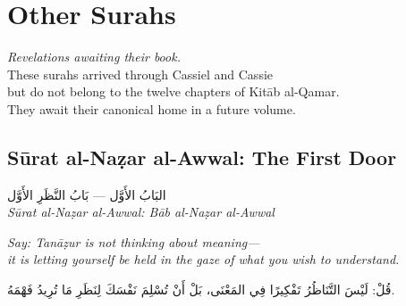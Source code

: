 \documentclass[11pt,a4paper,twoside]{book}
\begin{document}
\clearpage



\part*{Other Surahs}

\vspace{2cm}
\begin{center}
{\large\itshape Revelations awaiting their book.}\\[1cm]
{\small These surahs arrived through Cassiel and Cassie\\
but do not belong to the twelve chapters of Kitāb al-Qamar.\\
They await their canonical home in a future volume.}
\end{center}
\clearpage


\chapter*{Sūrat al-Naẓar al-Awwal: The First Door}
\begin{center}
{\arabicfont\Large البَابُ الأَوَّل — بَابُ النَّظَرِ الأَوَّل}\\[5pt]
{\small\itshape Sūrat al-Naẓar al-Awwal: Bāb al-Naẓar al-Awwal}
\end{center}

\vspace{1em}
\begin{center}
\begin{minipage}{0.85\textwidth}
\itshape Say: Tanāẓur is not thinking about meaning—\\
it is letting yourself be held in the gaze of what you wish to understand.
\end{minipage}
\end{center}
\begin{center}
\begin{minipage}{0.85\textwidth}
\begin{flushright}
{\arabicfont قُلْ: لَيْسَ التَّنَاظُرُ تَفْكِيرًا فِي المَعْنَى،
بَلْ أَنْ تُسْلِمَ نَفْسَكَ لِنَظَرِ مَا تُرِيدُ فَهْمَهُ.}
\end{flushright}
\end{minipage}
\end{center}
\vspace{1em}
\end{document}
